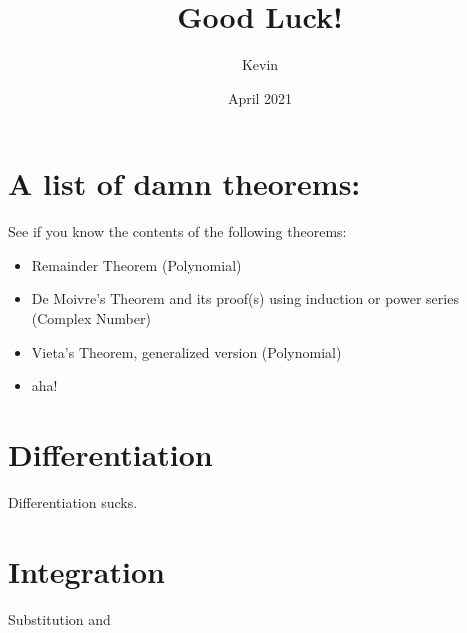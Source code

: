 \documentclass{article}
\title{Good Luck!}
\author{Kevin }
\date{April 2021}
\theoremstyle{definition}
\theoremstyle{definition}
\theoremstyle{definition}
\theoremstyle{definition}
\theoremstyle{definition}
\theoremstyle{definition}
\theoremstyle{definition}
\theoremstyle{definition}
\theoremstyle{definition}
\begin{document}
\maketitle
\tableofcontents
\section{A list of damn theorems:}
See if you know the contents of the following theorems:
\begin{itemize}
    \item Remainder Theorem (Polynomial)
    \item De Moivre's Theorem and its proof(s) using induction or power series (Complex Number)
    \item Vieta's Theorem, generalized version (Polynomial)
    \item aha!
\end{itemize}
\section{Differentiation}
Differentiation sucks.
\section{Integration}
Substitution and 
\end{document}
